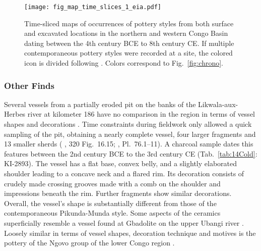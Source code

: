 \documentclass[smallextended,natbib]{svjour3}       %
\begin{document}
\begin{figure}[!tbp]
	\centering
	\texttt{[image: fig\_map\_time\_slices\_1\_eia.pdf]}
	\caption{Time-sliced maps of occurrences of pottery styles from both surface and excavated locations in the northern and western Congo Basin dating between the 4th century BCE to 8th century CE. If multiple contemporaneous pottery styles were recorded at a site, the colored icon is divided following \citet[218--244 Fig.~100--107]{Seidensticker.2021e}. Colors correspond to Fig.~\ref{fig:chrono}.}
	\label{fig:timeslices_1_eia}
\end{figure}

\subsubsection*{Other Finds}

Several vessels from a partially eroded pit on the banks of the Likwala-aux-Herbes river at kilometer 186 have no comparison in the region in terms of vessel shapes and decorations \citep[165--168, 339--340]{Seidensticker.2021e}. Time constraints during fieldwork only allowed a quick sampling of the pit, obtaining a nearly complete vessel, four larger fragments and 13 smaller sherds (\citeauthor{Eggert.1993} \citeyear{Eggert.1993}, 320 Fig.~16.15; \citeauthor{Seidensticker.2021e} \citeyear{Seidensticker.2021e}, Pl.~76.1--11). A charcoal sample dates this features between the 2nd century BCE to the 3rd century CE (Tab.~\ref{tab:14Cold}: KI-2893). The vessel has a flat base, convex belly, and a slightly elaborated shoulder leading to a concave neck and a flared rim. Its decoration consists of crudely made crossing grooves made with a comb on the shoulder and impressions beneath the rim. Further fragments show similar decorations. Overall, the vessel's shape is substantially different from those of the contemporaneous Pikunda-Munda style. Some aspects of the ceramics superficially resemble a vessel found at Gbadolite on the upper Ubangi river \citep[277--278 Fig.~7]{Eggert.1984}. Loosely similar in terms of vessel shapes, decoration technique and motives is the pottery of the Ngovo group of the lower Congo region \citep[167 Fig.~81]{deMaret.1986,Seidensticker.2021e}.
\end{document}
